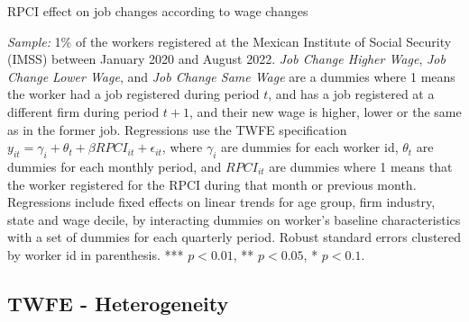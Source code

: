 \documentclass[oneside,11pt]{article}
\begin{document}
\clearpage

\begin{table}[H]
    \caption{RPCI effect on job changes according to wage changes}
    \label{twfe_job_change_wage}
    \begin{center}
    \scriptsize{}
    \end{center}
\end{table}

\scriptsize{
\noindent \textit{Sample:} 1\% of the workers registered at the Mexican Institute of Social Security (IMSS) between January 2020 and August 2022. \textit{Job Change Higher Wage}, \textit{Job Change Lower Wage}, and \textit{Job Change Same Wage} are a dummies where 1 means the worker had a job registered during period $t$, and has a job registered at a different firm during period $t+1$, and their new wage is higher, lower or the same as in the former job. Regressions use the TWFE specification $y_{it} = \gamma_{i} + \theta_{t}+ \beta RPCI_{it} +\epsilon_{it}$, where $\gamma_{i}$ are dummies for each worker id, $\theta_{t}$ are dummies for each monthly period, and $RPCI_{it}$ are dummies where 1 means that the worker registered for the RPCI during that month or previous month. Regressions include fixed effects on linear trends for age group, firm industry, state and wage decile, by interacting dummies on worker's baseline characteristics with a set of dummies for each quarterly period. Robust standard errors clustered by worker id in parenthesis. *** $p<0.01$, ** $p<0.05$, * $p<0.1$.
}

\clearpage

\subsection{TWFE - Heterogeneity}
\end{document}
